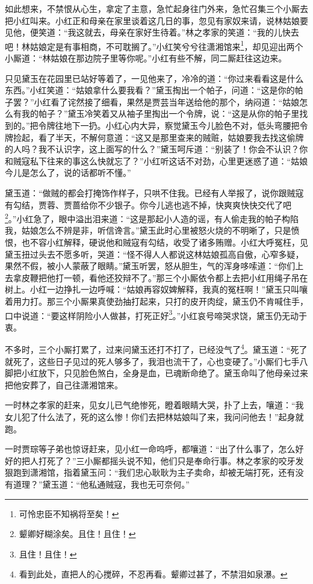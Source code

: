 \documentclass[12pt,oneside]{book}
\begin{document}
如此想来，不禁恨从心生，拿定了主意，急忙起身往门外来，急忙召集三个小厮去把小红叫来。小红正和母亲在家里谈着这几日的事，忽见有家奴来请，说林姑娘要见他，便笑道：“我这就去，母亲在家好生待着。”林之孝家的笑道：“我的儿快去吧！林姑娘定是有事相商，不可耽搁了。”小红笑兮兮往潇湘馆来\footnote{可怜忠臣不知祸将至矣！}，却见迎出两个小厮道：“林姑娘在那边院子里等你呢。”小红有些不解，同二厮赶往这边来。

只见黛玉在花园里已站好等着了，一见他来了，冷冷的道：“你过来看看这是什么东西。”小红笑道：“姑娘拿什么要我看？”黛玉掏出一个帕子，问道：“这是你的帕子罢？”小红看了诧然接了细看，果然是贾芸当年送给他的那个，纳闷道：“姑娘怎么有我的帕子？”黛玉冷笑着又从袖子里掏出一个令牌，说：“这是从你的帕子里找到的。”把令牌往地下一扔。小红心内大异，察觉黛玉今儿脸色不对，低头弯腰把令牌捡起，看了半天，不解何意道：“这又是那里查来的贼赃，姑娘要我去找这偷牌的人吗？我不认识字，这上面写的什么？”黛玉呵斥道：“别装了！你会不认识？你和贼寇私下往来的事这么快就忘了？”小红听这话不对劲，心里更迷惑了道：“姑娘今儿是怎么了，说的话都听不懂。”

黛玉道：“做贼的都会打掩饰作样子，只哄不住我。已经有人举报了，说你跟贼寇有勾结，贾蓉、贾蔷给你不少银子。你今儿逃也逃不掉，快爽爽快快交代了吧\footnote{颦卿好糊涂矣。且住！且住！}。”小红急了，眼中溢出泪来道：“这是那起小人造的谣，有人偷走我的帕子构陷我，姑娘怎么不辨是非，听信谗言。”黛玉此时心里被怒火烧的不明晰了，只是愤恨，也不容小红解释，硬说他和贼寇有勾结，收受了诸多贿赠。小红大呼冤枉，见黛玉扭过头去不愿多听，哭道：“怪不得人人都说这林姑娘孤高自傲，心窄多疑，果然不假，被小人蒙蔽了眼睛。”黛玉听罢，怒从胆生，气的浑身哆嗦道：“你们上去拿皮鞭把他打一顿，看他还狡辩不了。”那三个小厮依令都上去把小红用绳子吊在树上。小红一边挣扎一边呼喊：“姑娘再容奴婢解释，我真的冤枉啊！”黛玉只叫嚷着用力打。那三个小厮果真使劲抽打起来，只打的皮开肉绽，黛玉仍不肯喊住手，口中说道：“要这样阴险小人做甚，打死正好\footnote{且住！且住！}。”小红哀号啼哭求饶，黛玉仍无动于衷。

不多时，三个小厮打累了，过来问黛玉还打不打了，已经没气了\footnote{看到此处，直把人的心搅碎，不忍再看。颦卿过甚了，不禁泪如泉瀑。}。黛玉道：“死了就死了，这些日子见过的死人够多了，我泪也流干了，心也变硬了。”小厮们七手八脚把小红放下，只见脸色煞白，全身是血，已魂断命绝了。黛玉命叫了他母亲过来把他安葬了，自己往潇湘馆来。

一时林之孝家的赶来，见女儿已气绝惨死，瞪着眼睛大哭，扑了上去，嚷道：“我女儿犯了什么法了，死的这么惨！你们去把林姑娘叫了来，我问问他去！”起身就跑。

一时贾琮等子弟也惊讶赶来，见小红一命呜呼，都嚷道：“出了什么事了，怎么好好的把人打死了？”三小厮都摇头说不知，他们只是奉命行事。林之孝家的咬牙发狠跑到潇湘馆，指着黛玉问：“我们忠心耿耿为主子卖命，却被无端打死，还有没有道理？”黛玉道：“他私通贼寇，我也无可奈何。”
\end{document}
